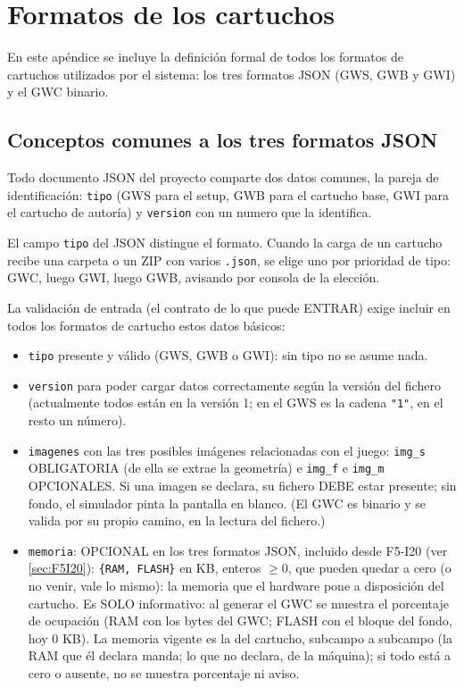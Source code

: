 \documentclass[../main.tex]{subfiles}
\begin{document}
\chapter{Formatos de los cartuchos}
\label{sec:Formatos}
	
En este apéndice se incluye la definición formal de todos los formatos de cartuchos utilizados por el sistema: los tres formatos JSON (GWS, GWB y GWI) y el GWC binario.

\section{Conceptos comunes a los tres formatos JSON}
\label{sec:A02Comun}

Todo documento JSON del proyecto comparte dos datos comunes, la pareja de
identificación: \texttt{tipo} (GWS para el setup, GWB para el cartucho base, GWI para el 
cartucho de autoría) y \texttt{version} con un numero que la identifica. 

El campo \texttt{tipo} del JSON distingue el
formato. Cuando la carga de un cartucho recibe una carpeta o un ZIP con varios
\texttt{.json}, se elige uno por prioridad de tipo: GWC, luego GWI, luego
GWB, avisando por consola de la elección.

La validación de entrada (el contrato de lo que puede ENTRAR) exige incluir en todos los 
formatos de cartucho estos datos básicos:

\begin{itemize}
	\item \texttt{tipo} presente y válido (GWS, GWB o GWI): sin tipo no se
	asume nada.

	\item \texttt{version} para poder cargar datos correctamente según la versión del fichero (actualmente todos están en la versión 1; en el GWS es la cadena \texttt{"1"}, en el resto un número).

	\item \texttt{imagenes} con las tres posibles imágenes relacionadas con el juego: \texttt{img\_s} OBLIGATORIA (de ella se extrae la geometría) e \texttt{img\_f} e \texttt{img\_m} OPCIONALES. Si una imagen se declara, su fichero DEBE estar presente; sin fondo, el simulador pinta la pantalla en blanco. (El GWC es binario y se valida por su propio camino, en la lectura del fichero.)
	
	\item \texttt{memoria}: OPCIONAL en los tres formatos JSON, incluido
	desde F5-I20 (ver \ref{sec:F5I20}): \texttt{\{RAM, FLASH\}} en
	KB, enteros $\ge 0$, que pueden quedar a cero (o no venir, vale lo
	mismo): la memoria que el hardware pone a disposición del cartucho.
	Es SOLO informativo: al generar el GWC se muestra el porcentaje de
	ocupación (RAM con los bytes del GWC; FLASH con el bloque del fondo,
	hoy 0 KB). La memoria vigente es la del cartucho, subcampo a subcampo
	(la RAM que él declara manda; lo que no declara, de la máquina); si
	todo está a cero o ausente, no se muestra porcentaje ni aviso.
\end{itemize}

	\clearpage
	\clearpage
	\clearpage
	\clearpage
		
\end{document}
